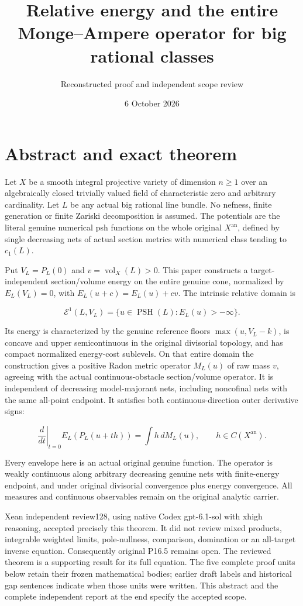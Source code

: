 \documentclass[
  10pt,
]{article}
\title{Relative energy and the entire Monge--Ampere operator for big
rational classes}
\author{Reconstructed proof and independent scope review}
\date{6 October 2026}
\begin{document}
\maketitle

\section{Abstract and exact theorem}\label{abstract-and-exact-theorem}

Let \(X\) be a smooth integral projective variety of dimension \(n\ge1\)
over an algebraically closed trivially valued field of characteristic
zero and arbitrary cardinality. Let \(L\) be any actual big rational
line bundle. No nefness, finite generation or finite Zariski
decomposition is assumed. The potentials are the literal genuine
numerical psh functions on the whole original \(X^{\mathrm{an}}\),
defined by single decreasing nets of actual section metrics with
numerical class tending to \(c_1(L)\).

Put \(V_L=P_L(0)\) and \(v=\operatorname{vol}_X(L)>0\). This paper
constructs a target-independent section/volume energy on the entire
genuine cone, normalized by \(E_L(V_L)=0\), with \(E_L(u+c)=E_L(u)+cv\).
The intrinsic relative domain is

\[\mathcal E^1(L,V_L)=\{u\in\operatorname{PSH}(L):E_L(u)>-\infty\}.\]

Its energy is characterized by the genuine reference floors
\(\max(u,V_L-k)\), is concave and upper semicontinuous in the original
divisorial topology, and has compact normalized energy-cost sublevels.
On that entire domain the construction gives a positive Radon metric
operator \(M_L(u)\) of raw mass \(v\), agreeing with the actual
continuous-obstacle section/volume operator. It is independent of
decreasing model-majorant nets, including noncofinal nets with the same
all-point endpoint. It satisfies both continuous-direction outer
derivative signs:

\[\left.\frac{d}{dt}\right|_{t=0}E_L(P_L(u+th))
   =\int h\,dM_L(u),\qquad h\in C(X^{\mathrm{an}}).\]

Every envelope here is an actual original genuine function. The operator
is weakly continuous along arbitrary decreasing genuine nets with
finite-energy endpoint, and under original divisorial convergence plus
energy convergence. All measures and continuous observables remain on
the original analytic carrier.

Xean independent review128, using native Codex gpt-6.1-sol with xhigh
reasoning, accepted precisely this theorem. It did not review mixed
products, integrable weighted limits, pole-nullness, comparison,
domination or an all-target inverse equation. Consequently original
P16.5 remains open. The reviewed theorem is a supporting result for its
full equation. The five complete proof units below retain their frozen
mathematical bodies; earlier draft labels and historical gap sentences
indicate when those units were written. This abstract and the complete
independent report at the end specify the accepted scope.
\end{document}
